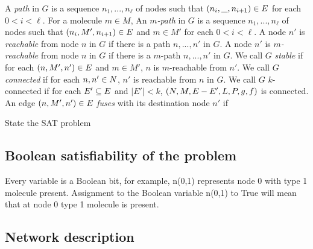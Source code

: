 A {\em path} in $G$ is a sequence $n_1,...,n_\ell$ of nodes 
such that $(n_i,\_,n_{i+1}) \in E$ for each $ 0 < i < \ell$.
%
For a molecule $m \in M$,
An {\em $m$-path} in $G$ is a sequence $n_1,...,n_\ell$ of nodes 
such that $(n_i,M',n_{i+1}) \in E$ and $m \in M'$ for
each $ 0 < i < \ell$.
%
A node $n'$ is {\em reachable} from node $n$ in $G$ if there is a path
$n,...,n'$ in $G$.
%
A node $n'$ is {\em $m$-reachable} from node $n$ in $G$ if there is a
$m$-path $n,...,n'$ in $G$.
%
We call $G$ {\em stable} if for each $(n,M',n') \in E$ and $m \in M'$,
$n$ is $m$-reachable from $n'$.
%
We call $G$ {\em connected} if for each $n,n' \in N$,
$n'$ is reachable from $n$ in $G$.
%
We call $G$ $k$-connected if for each $E' \subseteq E$ and $|E'| < k$,
$(N,M,E-E',L,P,g,f)$ is connected.
%
An edge $(n,M',n') \in E$ {\em fuses} with its destination node $n'$
if 


State the SAT problem


\subsection{Boolean satisfiability of the problem}



Every variable is a Boolean bit, for example, n(0,1) represents node 0 with type 1 molecule present. Assignment to the Boolean variable n(0,1) to True will mean that at node 0 type 1 molecule is present. 


\subsection{Network description}

